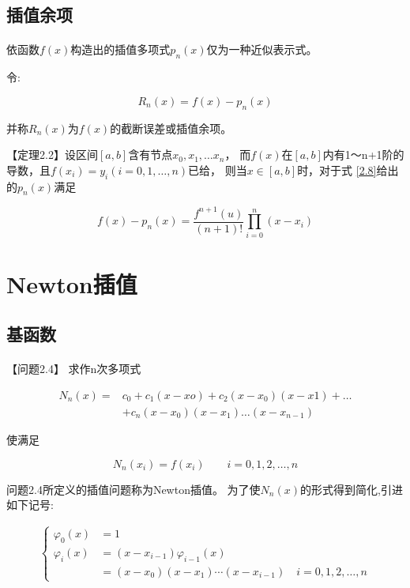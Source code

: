 \documentclass[12pt]{report}
\begin{document}
\subsection{插值余项}

\paragraph{ } 依函数$f(x)$构造出的插值多项式$p_n(x)$仅为一种近似表示式。

令:

\[ R_n(x) = f(x) - p_n(x) \tag{2.8} \label{2.8} \]

并称$R_n(x)$为$f(x)$的截断误差或插值余项。

【定理2.2】\quad 设区间$[a,b]$含有节点$x_0,x_1, \ldots x_n$，
而$f(x)$在$[a,b]$内有1～n+1阶的导数，且$f(x_i)=y_i(i=0,1, \ldots ,n)$已给，
则当$x\in[a,b]$时，对于式 \eqref{2.8}给出的$p_n(x)$满足

\[ f(x)-p_n(x) = \frac{f^{n+1}(u)}{(n+1)!} \prod_{i=0}^n(x-x_i) \tag{2.9} \label{2.9} \]


\section{Newton插值}

\subsection{基函数}

\paragraph{} 【问题2.4】 \quad 求作n次多项式

\begin{align*}
	N_n(x) = & c_0 + c_1(x-xo) + c_2(x-x_0)(x-x1) + \ldots \\
	         & + c_n(x- x_0)(x-x_1)\ldots(x-x_{n-1})
\end{align*}

使满足

\[
	N_n(x_i) = f(x_i) \qquad
	i=0,1,2,\ldots,n
\]

问题2.4所定义的插值问题称为Newton插值。
为了使$N_n(x)$的形式得到简化,引进如下记号:

\begin{align*}
	\begin{cases}
		\varphi_0(x) & = 1                                                                                  \\
		\varphi_i(x) & = (x-x_{i-1})\varphi_{i-1}(x)                                                        \\
		             & = (x-x_{0})(x-x_{1})\cdots(x-x_{i-1}) \quad i=0,1,2,\ldots,n \tag{2.10} \label{2.10}
	\end{cases}
\end{align*}
\end{document}
